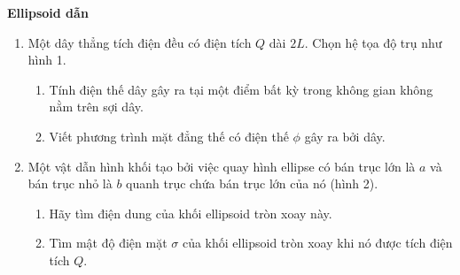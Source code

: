 \textbf{Ellipsoid dẫn}

\begin{enumerate}
    \item Một dây thẳng tích điện đều có điện tích $Q$ dài $2L$. Chọn hệ tọa độ trụ như hình 1.
    \begin{enumerate}[label=\textbf{\alph*,}]\itemsep0em
    \item Tính điện thế dây gây ra tại một điểm bất kỳ trong không gian không nằm trên sợi dây.
    \item Viết phương trình mặt đẳng thế có điện thế $\phi$ gây ra bởi dây.
    \end{enumerate}
    \item Một vật dẫn hình khối tạo bởi việc quay hình ellipse có bán trục lớn là $a$ và bán trục nhỏ là $b$ quanh trục chứa bán trục lớn của nó (hình 2).
    \begin{enumerate}[label=\textbf{\alph*,}]\itemsep0em
    \item Hãy tìm điện dung của khối ellipsoid tròn xoay này.
    \item Tìm mật độ điện mặt $\sigma$ của khối ellipsoid tròn xoay khi nó được tích điện tích $Q$.
    \end{enumerate}
\end{enumerate}

